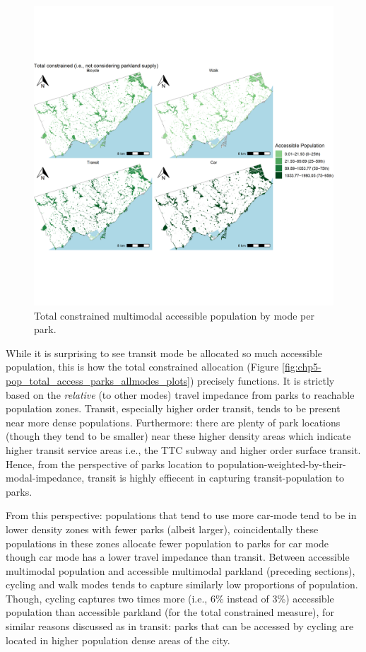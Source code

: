 \documentclass[
11pt, %
oneside, %
english, %
singlespacing, %
]{macthesis} %
\begin{document}
\begin{figure}

{\centering \includegraphics[width=6in]{./data/figures/chp5-pop_total_access_parks_allmodes_plots} 

}

\caption{\label{fig:chp5-pop_total_access_parks_allmodes_plots} Total constrained multimodal accessible population by mode per park.}\label{fig:unnamed-chunk-89}
\end{figure}

While it is surprising to see transit mode be allocated so much accessible population, this is how the total constrained allocation (Figure \ref{fig:chp5-pop_total_access_parks_allmodes_plots}) precisely functions. It is strictly based on the \emph{relative} (to other modes) travel impedance from parks to reachable population zones. Transit, especially higher order transit, tends to be present near more dense populations. Furthermore: there are plenty of park locations (though they tend to be smaller) near these higher density areas which indicate higher transit service areas i.e., the TTC subway and higher order surface transit. Hence, from the perspective of parks location to population-weighted-by-their-modal-impedance, transit is highly effiecent in capturing transit-population to parks.

From this perspective: populations that tend to use more car-mode tend to be in lower density zones with fewer parks (albeit larger), coincidentally these populations in these zones allocate fewer population to parks for car mode though car mode has a lower travel impedance than transit. Between accessible multimodal population and accessible multimodal parkland (preceding sections), cycling and walk modes tends to capture similarly low proportions of population. Though, cycling captures two times more (i.e., 6\% instead of 3\%) accessible population than accessible parkland (for the total constrained measure), for similar reasons discussed as in transit: parks that can be accessed by cycling are located in higher population dense areas of the city.
\end{document}
